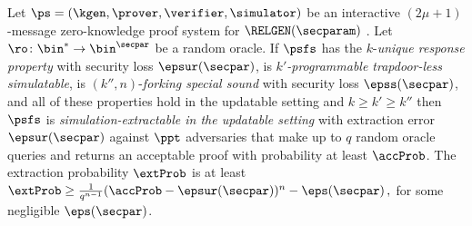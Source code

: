 
\begin{theorem}
	\label{thm:se}
	Let $\ps = (\kgen, \prover, \verifier, \simulator)$ be an interactive
	$(2 \mu + 1)$-message zero-knowledge proof system for $\RELGEN(\secparam)$
	. Let
	$\ro\colon \bin^{*} \to \bin^{\secpar}$ be a random oracle. If $\psfs$ has the
	$k$-\emph{unique response property} with security loss $\epsur(\secpar)$, is
	\emph{$k'$-programmable trapdoor-less simulatable}, is $(k'', n)$-\emph{forking
		special sound} with security loss $\epss(\secpar)$, and all of these properties
	hold in the updatable setting and $k \geq k' \geq k''$ then $\psfs$ is
	\emph{simulation-extractable in the updatable setting} with extraction error
	\textcolor{red}{$\epsur(\secpar)$} against $\ppt$ adversaries that make up to $q$ random oracle
	queries and returns an acceptable proof with probability at least $\accProb$.  The
	extraction probability $\extProb$ is at least
	\textcolor{red}{\( \extProb \geq \frac{1}{q^{n - 1}} (\accProb - \epsur(\secpar))^{n}
		-\eps(\secpar)\,, \)} for some negligible $\eps(\secpar)$.
\end{theorem}
